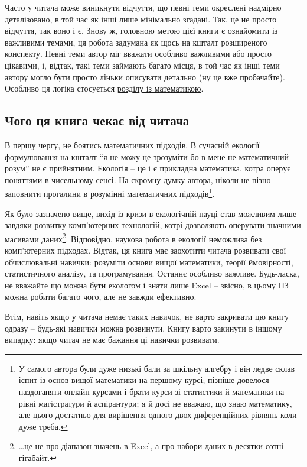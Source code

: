 \documentclass[
  11pt,
]{book}
\begin{document}
Часто у читача може виникнути відчуття, що певні теми окреслені надмірно деталізовано, в той час як інші лише мінімально згадані. Так, це не просто відчуття, так воно і є. Знову ж, головною метою цієї книги є ознайомити із важливими темами, ця робота задумана як щось на кшталт розширеного конспекту. Певні теми автор міг вважати особливо важливими або просто цікавими, і, відтак, такі теми займають багато місця, в той час як інші теми автору могло бути просто ліньки описувати детально (ну це вже пробачайте). Особливо ця логіка стосується \hyperref[numerical-ecology]{розділу із математикою}.

\subsection{Чого ця книга чекає від читача}\label{expected}

В першу чергу, не боятись математичних підходів. В сучасній екології формулювання на кшталт ``я не можу це зрозуміти бо в мене не математичний розум'' не є прийнятним. Екологія -- це і є прикладна математика, котра оперує поняттями в чисельному сенсі. На скромну думку автора, ніколи не пізно заповнити прогалини в розумінні математичних підходів\footnote{У самого автора були дуже низькі бали за шкільну алгебру і він ледве склав іспит із основ вищої математики на першому курсі; пізніше довелося наздоганяти онлайн-курсами і брати курси зі статистики й математики на рівні магістратури й аспірантури; я й досі не вважаю, що знаю математику, але цього достатньо для вирішення одного-двох диференційних рівнянь коли дуже треба.}.

Як було зазначено вище, вихід із кризи в екологічній науці став можливим лише завдяки розвитку комп'ютерних технологій, котрі дозволяють оперувати значними масивами даних\footnote{\ldots це не про діапазон значень в Excel, а про набори даних в десятки-сотні гігабайт.}. Відповідно, наукова робота в екології неможлива без комп'ютерних підходах. Відтак, ця книга має заохотити читача розвивати свої обчислювальні навички: розуміти основи вищої математики, теорії ймовірності, статистичного аналізу, та програмування. Останнє особливо важливе. Будь-ласка, не вважайте що можна бути екологом і знати лише Excel -- звісно, в цьому ПЗ можна робити багато чого, але не завжди ефективно.

Втім, навіть якщо у читача немає таких навичок, не варто закривати цю книгу одразу -- будь-які навички можна розвинути. Книгу варто закинути в іншому випадку: якщо читач не має бажання ці навички розвивати.
\end{document}
